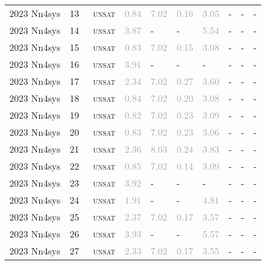 \begin{center}
{\begin{longtable}{@{}llllllllll@{}}
2023 Nn4sys & 13 & ~\textsc{unsat} & \textcolor{darkgray}{0.84} & \textcolor{darkgray}{7.02} & \textcolor{darkgray}{0.16} & \textcolor{darkgray}{3.05} & - & - & - \\
2023 Nn4sys & 14 & ~\textsc{unsat} & \textcolor{darkgray}{3.87} & - & - & \textcolor{darkgray}{5.54} & - & - & - \\
2023 Nn4sys & 15 & ~\textsc{unsat} & \textcolor{darkgray}{0.83} & \textcolor{darkgray}{7.02} & \textcolor{darkgray}{0.15} & \textcolor{darkgray}{3.08} & - & - & - \\
2023 Nn4sys & 16 & ~\textsc{unsat} & \textcolor{darkgray}{3.91} & - & - & - & - & - & - \\
2023 Nn4sys & 17 & ~\textsc{unsat} & \textcolor{darkgray}{2.34} & \textcolor{darkgray}{7.02} & \textcolor{darkgray}{0.27} & \textcolor{darkgray}{3.60} & - & - & - \\
2023 Nn4sys & 18 & ~\textsc{unsat} & \textcolor{darkgray}{0.84} & \textcolor{darkgray}{7.02} & \textcolor{darkgray}{0.20} & \textcolor{darkgray}{3.08} & - & - & - \\
2023 Nn4sys & 19 & ~\textsc{unsat} & \textcolor{darkgray}{0.82} & \textcolor{darkgray}{7.02} & \textcolor{darkgray}{0.23} & \textcolor{darkgray}{3.09} & - & - & - \\
2023 Nn4sys & 20 & ~\textsc{unsat} & \textcolor{darkgray}{0.83} & \textcolor{darkgray}{7.02} & \textcolor{darkgray}{0.23} & \textcolor{darkgray}{3.06} & - & - & - \\
2023 Nn4sys & 21 & ~\textsc{unsat} & \textcolor{darkgray}{2.36} & \textcolor{darkgray}{8.03} & \textcolor{darkgray}{0.24} & \textcolor{darkgray}{3.83} & - & - & - \\
2023 Nn4sys & 22 & ~\textsc{unsat} & \textcolor{darkgray}{0.85} & \textcolor{darkgray}{7.02} & \textcolor{darkgray}{0.14} & \textcolor{darkgray}{3.09} & - & - & - \\
2023 Nn4sys & 23 & ~\textsc{unsat} & \textcolor{darkgray}{3.92} & - & - & - & - & - & - \\
2023 Nn4sys & 24 & ~\textsc{unsat} & \textcolor{darkgray}{1.91} & - & - & \textcolor{darkgray}{4.81} & - & - & - \\
2023 Nn4sys & 25 & ~\textsc{unsat} & \textcolor{darkgray}{2.37} & \textcolor{darkgray}{7.02} & \textcolor{darkgray}{0.17} & \textcolor{darkgray}{3.57} & - & - & - \\
2023 Nn4sys & 26 & ~\textsc{unsat} & \textcolor{darkgray}{3.93} & - & - & \textcolor{darkgray}{5.57} & - & - & - \\
2023 Nn4sys & 27 & ~\textsc{unsat} & \textcolor{darkgray}{2.33} & \textcolor{darkgray}{7.02} & \textcolor{darkgray}{0.17} & \textcolor{darkgray}{3.55} & - & - & - \\

\end{longtable}}
\end{center}
